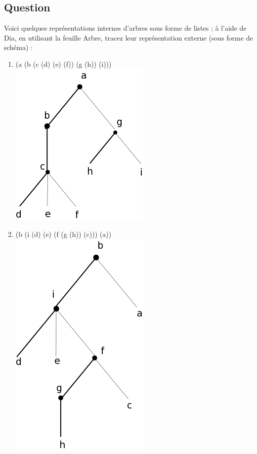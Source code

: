 \documentclass[a4paper, 11pt]{article}
\begin{document}
\subsection{Question}
Voici quelques représentations internes d'arbres sous forme de listes ; à l'aide de Dia, en utilisant la feuille Arbre, tracez leur représentation externe (sous forme de schéma) :
\begin{enumerate}
    \item (a (b (c (d) (e) (f)) (g (h)) (i)))\\\includegraphics[scale=0.3]{reponse1.png}
    \item (b (i (d) (e) (f (g (h)) (c))) (a))\\\includegraphics[scale=0.3]{reponse2.png}

\end{enumerate}
\end{document}
